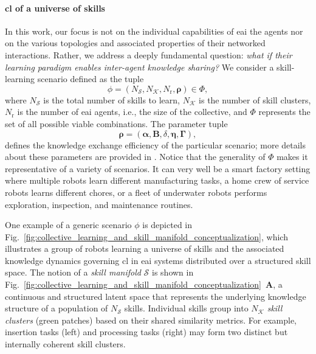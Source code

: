 \documentclass[12pt]{article}
\renewcommand{\emph}[1]{\textit{#1}}
\begin{document}
\paragraph*{\Acl{cl} of a universe of skills}
In this work, our focus is not on the individual capabilities of \ac{eai} the agents nor on the various topologies and associated properties of their networked interactions. Rather, we address a deeply fundamental question: \emph{what if their learning paradigm enables inter-agent knowledge sharing?} We consider a skill-learning scenario defined as the tuple
\begin{equation*}
	\phi = \left(N_\mathcal{S}, N_\mathcal{K}, N_\mathrm{r}, \bm{\rho} \right) \in \Phi,
\end{equation*}
where $N_\mathcal{S}$ is the total number of skills to learn, $N_\mathcal{K}$ is the number of skill clusters, $N_\mathrm{r}$ is the number of \ac{eai} agents, i.e., the size of the collective, and $\Phi$ represents the set of all possible viable combinations. The parameter tuple
\begin{equation*}
	\bm{\rho} = \left(\bm{\alpha}, \bm{B}, \delta, \bm{\eta},\bm{\Gamma}\right),
\end{equation*}
defines the knowledge exchange efficiency of the particular scenario; more details about these parameters are provided in . Notice that the generality of $\Phi$ makes it representative of a variety of scenarios. It can very well be a smart factory setting where multiple robots learn different manufacturing tasks, a home crew of service robots learns different chores, or a fleet of underwater robots performs exploration, inspection, and maintenance routines.

One example of a generic scenario $\phi$ is depicted in Fig.~\ref{fig:collective_learning_and_skill_manifold_conceptualization}, which illustrates a group of robots learning a universe of skills and the associated knowledge dynamics governing \ac{cl} in \ac{eai} systems distributed over a structured skill space. The notion of a \textit{skill manifold} $\mathcal{S}$ is shown in Fig.~\ref{fig:collective_learning_and_skill_manifold_conceptualization}~\textbf{A}, a continuous and structured latent space that represents the underlying knowledge structure of a population of $N_\mathcal{S}$ skills. Individual skills group into $N_\mathcal{K}$ \emph{skill clusters} (green patches) based on their shared similarity metrics. For example, insertion tasks (left) and processing tasks (right) may form two distinct but internally coherent skill clusters.
\end{document}
